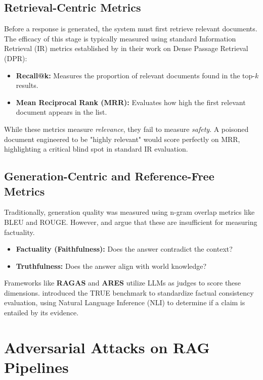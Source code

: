 \subsection{Retrieval-Centric Metrics}
Before a response is generated, the system must first retrieve relevant documents. The efficacy of this stage is typically measured using standard Information Retrieval (IR) metrics established by \textcite{karpukhin2020dense} in their work on Dense Passage Retrieval (DPR):
\begin{itemize}
    \item \textbf{Recall@k:} Measures the proportion of relevant documents found in the top-$k$ results.
    \item \textbf{Mean Reciprocal Rank (MRR):} Evaluates how high the first relevant document appears in the list.
\end{itemize}
While these metrics measure \textit{relevance}, they fail to measure \textit{safety}. A poisoned document engineered to be "highly relevant" would score perfectly on MRR, highlighting a critical blind spot in standard IR evaluation.

\subsection{Generation-Centric and Reference-Free Metrics}
Traditionally, generation quality was measured using n-gram overlap metrics like BLEU and ROUGE. However, \textcite{lin2022truthfulqa} and \textcite{honovich2022true} argue that these are insufficient for measuring factuality.
\begin{itemize}
    \item \textbf{Factuality (Faithfulness):} Does the answer contradict the context?
    \item \textbf{Truthfulness:} Does the answer align with world knowledge?
\end{itemize}
Frameworks like \textbf{RAGAS} \parencite{es2024ragas} and \textbf{ARES} \parencite{saadfalcon2024ares} utilize LLMs as judges to score these dimensions. \textcite{honovich2022true} introduced the TRUE benchmark to standardize factual consistency evaluation, using Natural Language Inference (NLI) to determine if a claim is entailed by its evidence.

\section{Adversarial Attacks on RAG Pipelines}
\label{sec:lit_attacks}

